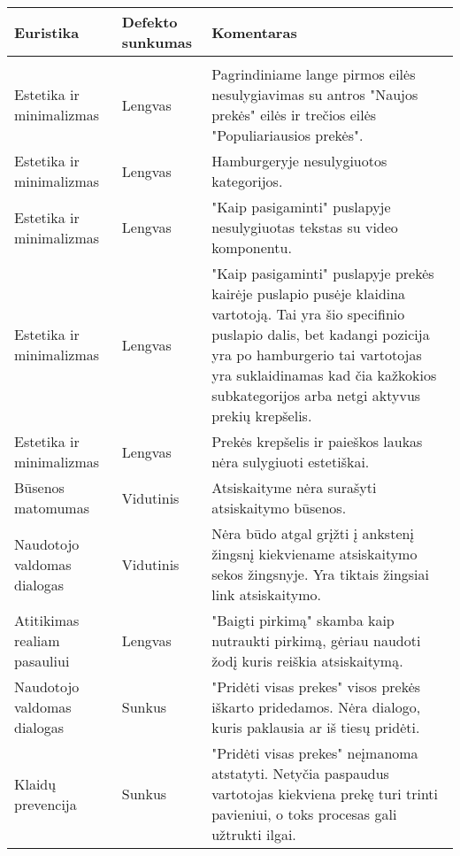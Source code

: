 \documentclass[oneside]{VUMIFPSkursinis}
\begin{document}
\begin{center}
	\begin{tabular}{ |p{3cm}| p{3cm} | p{11cm} | }
		\hline
		Euristika                    & Defekto sunkumas & Komentaras \\ \hline
			\\ \hline
		Estetika ir minimalizmas     & Lengvas          &
			Pagrindiniame lange pirmos eilės nesulygiavimas su antros "Naujos prekės" eilės ir trečios eilės "Populiariausios prekės".
			\\ \hline
		Estetika ir minimalizmas     & Lengvas          &
			Hamburgeryje nesulygiuotos kategorijos.
			\\ \hline
		Estetika ir minimalizmas     & Lengvas          &
			"Kaip pasigaminti" puslapyje nesulygiuotas tekstas su video komponentu.
			\\ \hline
		Estetika ir minimalizmas     & Lengvas          &
			"Kaip pasigaminti" puslapyje prekės kairėje puslapio pusėje klaidina vartotoją.
			Tai yra šio specifinio puslapio dalis, bet kadangi pozicija yra po hamburgerio tai vartotojas yra suklaidinamas kad čia kažkokios subkategorijos arba netgi aktyvus prekių krepšelis.
			\\ \hline
		Estetika ir minimalizmas     & Lengvas          &
			Prekės krepšelis ir paieškos laukas nėra sulygiuoti estetiškai.
			\\ \hline
		Būsenos matomumas            & Vidutinis        &
			Atsiskaityme nėra surašyti atsiskaitymo būsenos.
			\\ \hline
		Naudotojo valdomas dialogas  & Vidutinis         &
			Nėra būdo atgal grįžti į ankstenį žingsnį kiekviename atsiskaitymo sekos žingsnyje.
			Yra tiktais žingsiai link atsiskaitymo.
			\\ \hline
		Atitikimas realiam pasauliui & Lengvas          &
			"Baigti pirkimą" skamba kaip nutraukti pirkimą, gėriau naudoti žodį kuris reiškia atsiskaitymą.
			\\ \hline
		Naudotojo valdomas dialogas  & Sunkus           &
			"Pridėti visas prekes" visos prekės iškarto pridedamos.
			Nėra dialogo, kuris paklausia ar iš tiesų pridėti.
			\\ \hline
		Klaidų prevencija            & Sunkus           &
			"Pridėti visas prekes" neįmanoma atstatyti.
			Netyčia paspaudus vartotojas kiekviena prekę turi trinti pavieniui, o toks procesas gali užtrukti ilgai.
			\\ \hline
	\end{tabular}
\end{center}
\end{document}
